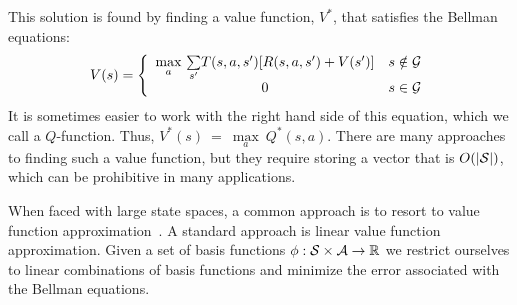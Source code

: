 This solution is found by finding a value function, $V^*$, that satisfies the Bellman equations:
$${V(s) = \left\{ \begin{array}{cl} \underset{a}{\max}\ \underset{s'}{\sum} T(s, a, s')[R(s, a, s') + V(s')] & s\notin \mathcal{G}{}\\ 0 & s\in \mathcal{G}{}\end{array}\right.}$$
It is sometimes easier to work with the right hand side of this equation, which we call a $Q$-function. Thus, $V^*(s)~=~\underset{a}{\max}\ Q^*(s, a)$.
There are many approaches to finding such a value function, but they require storing a vector that is $O(|\mathcal{S}{}|)$, which can be prohibitive in many applications. 


When faced with large state spaces, a common approach is to resort to value function approximation~\cite{schweitzer1985generalized}. 
A standard approach is linear value function approximation. 
Given a set of basis functions $\phi: \mathcal{S}{}\times \mathcal{A}{} \rightarrow \mathbb{R}$ we restrict ourselves to linear combinations of basis functions
and minimize the error associated with the Bellman equations. 

